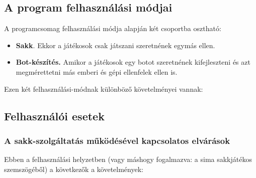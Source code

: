 \documentclass[twoside, a4paper, 12pt]{article}
\begin{document}
\subsection{A program felhasználási módjai}
A programcsomag felhasználási módja alapján két csoportba osztható:
\begin{itemize}
	\item \textbf{Sakk}. Ekkor a játékosok csak játszani szeretnének egymás ellen.
	
	\item \textbf{Bot-készítés.} Amikor a játékosok egy botot szeretnének kifejleszteni és azt megmérettetni más emberi és gépi ellenfelek ellen is.
\end{itemize}

Ezen két felhasználási-módnak különböző követelményei vannak:

\subsection{Felhasználói esetek}
\subsubsection{A sakk-szolgáltatás működésével kapcsolatos elvárások}
Ebben a felhasználási helyzetben (vagy máshogy fogalmazva: a sima sakkjátékos szemszögéből) a következők a követelmények:
\end{document}
